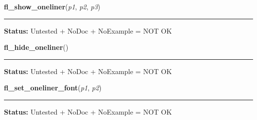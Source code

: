     \label{xformslib:library:fl_show_oneliner}

    \vspace{0.5ex}

\hspace{.8\funcindent}\begin{boxedminipage}{\funcwidth}

    \raggedright \textbf{fl\_show\_oneliner}(\textit{p1}, \textit{p2}, \textit{p3})

    \vspace{-1.5ex}

    \rule{\textwidth}{0.5\fboxrule}
\setlength{\parskip}{2ex}
\setlength{\parskip}{1ex}
\textbf{Status:} Untested + NoDoc + NoExample = NOT OK



    \end{boxedminipage}

    \label{xformslib:library:fl_hide_oneliner}

    \vspace{0.5ex}

\hspace{.8\funcindent}\begin{boxedminipage}{\funcwidth}

    \raggedright \textbf{fl\_hide\_oneliner}()

    \vspace{-1.5ex}

    \rule{\textwidth}{0.5\fboxrule}
\setlength{\parskip}{2ex}
\setlength{\parskip}{1ex}
\textbf{Status:} Untested + NoDoc + NoExample = NOT OK



    \end{boxedminipage}

    \label{xformslib:library:fl_set_oneliner_font}

    \vspace{0.5ex}

\hspace{.8\funcindent}\begin{boxedminipage}{\funcwidth}

    \raggedright \textbf{fl\_set\_oneliner\_font}(\textit{p1}, \textit{p2})

    \vspace{-1.5ex}

    \rule{\textwidth}{0.5\fboxrule}
\setlength{\parskip}{2ex}
\setlength{\parskip}{1ex}
\textbf{Status:} Untested + NoDoc + NoExample = NOT OK



    \end{boxedminipage}

